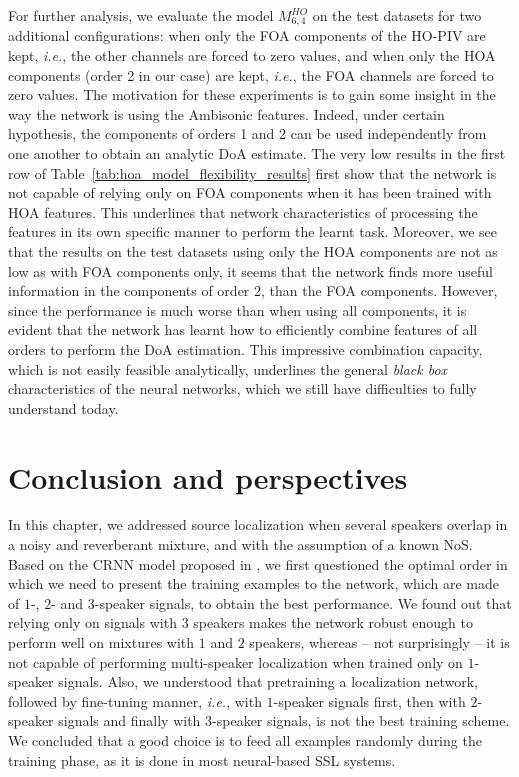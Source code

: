 For further analysis, we evaluate the model $M^{HO}_{6,4}$ on the test datasets for two additional configurations: when only the FOA components of the HO-PIV are kept, \emph{i.e.}, the other channels are forced to zero values, and when only the HOA components (order 2 in our case) are kept, \emph{i.e.}, the FOA channels are forced to zero values. The motivation for these experiments is to gain some insight in the way the network is using the Ambisonic features. Indeed, under certain hypothesis, the components of orders 1 and 2 can be used independently from one another to obtain an analytic DoA estimate.
The very low results in the first row of Table~\ref{tab:hoa_model_flexibility_results} first show that the network is not capable of relying only on FOA components when it has been trained with HOA features. This underlines that network characteristics of processing the features in its own specific manner to perform the learnt task. Moreover, we see that the results on the test datasets using only the HOA components are not as low as with FOA components only, it seems that the network finds more useful information in the components of order 2, than the FOA components. However, since the performance is much worse than when using all components, it is evident that the network has learnt how to efficiently combine features of all orders to perform the DoA estimation. This impressive combination capacity, which is not easily feasible analytically, underlines the general \textit{black box} characteristics of the neural networks, which we still have difficulties to fully understand today.

\section{Conclusion and perspectives}

In this chapter, we addressed source localization when several speakers overlap in a noisy and reverberant mixture, and with the assumption of a known NoS. Based on the CRNN model proposed in \cite{perotin_crnn-based_2019}, we first questioned the optimal order in which we need to present the training examples to the network, which are made of $1$-, $2$- and $3$-speaker signals, to obtain the best performance. We found out that relying only on signals with $3$ speakers makes the network robust enough to perform well on mixtures with $1$ and $2$ speakers, whereas -- not surprisingly -- it is not capable of performing multi-speaker localization when trained only on $1$-speaker signals. Also, we understood that pretraining a localization network, followed by fine-tuning manner, \emph{i.e.}, with $1$-speaker signals first, then with $2$-speaker signals and finally with $3$-speaker signals, is not the best training scheme. We concluded that a good choice is to feed all examples randomly during the training phase, as it is done in most neural-based SSL systems.

